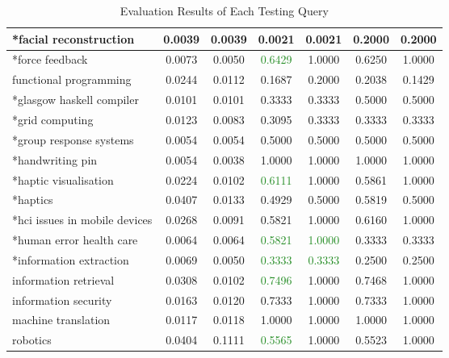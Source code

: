 \begin{table}
\begin{tabular}{|l|c|c|c|c|c|c|}
\hline *facial reconstruction & 0.0039 & 0.0039 & 0.0021 & 0.0021 & 0.2000 & 0.2000 \\
\hline *force feedback & 0.0073 & 0.0050 & \textcolor{ForestGreen}{0.6429} & 1.0000 & 0.6250 & 1.0000 \\
\hline functional programming & 0.0244 & 0.0112 & 0.1687 & 0.2000 & 0.2038 & 0.1429 \\
\hline *glasgow haskell compiler & 0.0101 & 0.0101 & 0.3333 & 0.3333 & 0.5000 & 0.5000 \\
\hline *grid computing & 0.0123 & 0.0083 & 0.3095 & 0.3333 & 0.3333 & 0.3333 \\
\hline *group response systems & 0.0054 & 0.0054 & 0.5000 & 0.5000 & 0.5000 & 0.5000 \\
\hline *handwriting pin & 0.0054 & 0.0038 & 1.0000 & 1.0000 & 1.0000 & 1.0000 \\
\hline *haptic visualisation & 0.0224 & 0.0102 & \textcolor{ForestGreen}{0.6111} & 1.0000 & 0.5861 & 1.0000 \\
\hline *haptics & 0.0407 & 0.0133 & 0.4929 & 0.5000 & 0.5819 & 0.5000 \\
\hline *hci issues in mobile devices & 0.0268 & 0.0091 & 0.5821 & 1.0000 & 0.6160 & 1.0000 \\
\hline *human error health care & 0.0064 & 0.0064 & \textcolor{ForestGreen}{0.5821} & \textcolor{ForestGreen}{1.0000} & 0.3333 & 0.3333 \\
\hline *information extraction & 0.0069 & 0.0050 & \textcolor{ForestGreen}{0.3333} & \textcolor{ForestGreen}{0.3333} & 0.2500 & 0.2500 \\
\hline information retrieval & 0.0308 & 0.0102 & \textcolor{ForestGreen}{0.7496} & 1.0000 & 0.7468 & 1.0000 \\
\hline information security & 0.0163 & 0.0120 & 0.7333 & 1.0000 & 0.7333 & 1.0000 \\
\hline machine translation & 0.0117 & 0.0118 & 1.0000 & 1.0000 & 1.0000 & 1.0000 \\
\hline robotics & 0.0404 & 0.1111 & \textcolor{ForestGreen}{0.5565} & 1.0000 & 0.5523 & 1.0000\\
\hline

\end{tabular}
\caption{Evaluation Results of Each Testing Query} \label{table:eachqueryevaluationresult}
\end{table}

